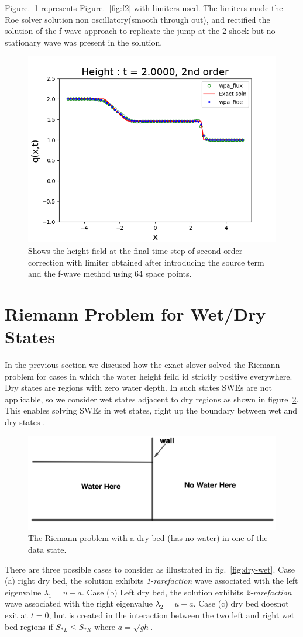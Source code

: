 \documentclass[12pt,a4paper]{article}
\newcommand{\donna}[1]{{\color{red}{#1}}}
\begin{document}
	  Figure.~\ref{fig:f2lim} represents Figure.~\ref{fig:f2}  with limiters used. The limiters made the Roe solver solution non oscillatory(smooth through out), and rectified the solution of the f-wave approach to replicate the jump at the 2-shock but no stationary wave was present in the solution.
	\begin{figure}[H]
		\centering
		\includegraphics[width=0.5\linewidth]{images/2lim}
		\caption{Shows the height field at the final time step of second order correction with limiter obtained after introducing the source term and the f-wave method using 64 space points.}
		\label{fig:f2lim}
	\end{figure}
	\section{Riemann Problem for Wet/Dry States}
	

	In the previous section we discused how the exact slover solved the Riemann problem for cases in which the water height feild id strictly positive everywhere. Dry states are regions with zero water depth. In such states SWEs are not applicable, so we consider wet states adjacent to dry regions as shown in figure~\ref{fig:dry-bed}. This enables solving SWEs in wet states, right up the boundary between wet and dry states \citep{toro2001shock}.
	\begin{figure}[H]
		\centering
		\includegraphics[width=0.5\linewidth]{images/dd1}
		\caption{ The Riemann problem with a dry bed (has no water) in one of the data state.}
		\label{fig:dry-bed}
	\end{figure}
	There are three possible cases to consider as illustrated in fig.~\ref{fig:dry-wet}. Case (a) right dry bed, the solution exhibits {\em 1-rarefaction} wave associated with the left eigenvalue $\lambda_1 = u - a$. Case (b) Left dry bed, the solution exhibits {\em 2-rarefaction} wave associated with the right eigenvalue $\lambda_2 = u + a$. Case (c) dry bed doesnot exit at $t=0$, but is created in the interaction between the two left and right wet bed regions if $S_{*L} \le S_{*R}$ where $a = \sqrt{gh}$.
	
\end{document}
